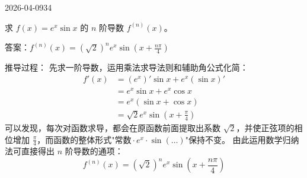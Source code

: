 \begin{mistake}{2026-04-09}{34}

\begin{problemcontent}
求 \( f(x) = e^x \sin x \) 的 \( n \) 阶导数 \( f^{(n)}(x) \)。
\end{problemcontent}

\begin{solutioncontent}
答案：\( f^{(n)}(x) = (\sqrt{2})^n e^x \sin\left(x + \frac{n\pi}{4}\right) \)

推导过程：
先求一阶导数，运用乘法求导法则和辅助角公式化简：
\[
\begin{aligned}
f'(x) &= (e^x)'\sin x + e^x(\sin x)' \\
&= e^x\sin x + e^x\cos x \\
&= e^x(\sin x + \cos x) \\
&= \sqrt{2}e^x\sin\left(x + \frac{\pi}{4}\right)
\end{aligned}
\]
可以发现，每次对函数求导，都会在原函数前面提取出系数 \( \sqrt{2} \)，并使正弦项的相位增加 \( \frac{\pi}{4} \)，而函数的整体形式"\( \text{常数} \cdot e^x \cdot \sin(\dots) \)"保持不变。
由此运用数学归纳法可直接得出 \( n \) 阶导数的通项：
\[
f^{(n)}(x) = (\sqrt{2})^n e^x \sin\left(x + \frac{n\pi}{4}\right)
\]
\end{solutioncontent}


\end{mistake}
